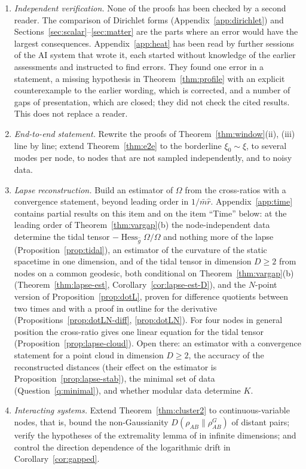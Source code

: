 \documentclass[11pt,a4paper]{article}
\theoremstyle{stmt}
\theoremstyle{defn}
\theoremstyle{rmk}
\numberwithin{equation}{section}
\begin{document}
\begin{enumerate}
\item \emph{Independent verification.} None of the proofs has been checked by a second reader. The comparison of Dirichlet forms (Appendix~\ref{app:dirichlet}) and Sections~\ref{sec:scalar}--\ref{sec:matter} are the parts where an error would have the largest consequences. Appendix~\ref{app:heat} has been read by further sessions of the AI system that wrote it, each started without knowledge of the earlier assessments and instructed to find errors. They found one error in a statement, a missing hypothesis in Theorem~\ref{thm:profile} with an explicit counterexample to the earlier wording, which is corrected, and a number of gaps of presentation, which are closed; they did not check the cited results. This does not replace a reader.
\item \emph{End-to-end statement.} Rewrite the proofs of Theorem~\ref{thm:window}(ii), (iii) line by line; extend Theorem~\ref{thm:e2e} to the borderline $\xi_0\sim\xi$, to several modes per node, to nodes that are not sampled independently, and to noisy data.
\item \emph{Lapse reconstruction.} Build an estimator of $\Omega$ from the cross-ratios with a convergence statement, beyond leading order in $1/\bar m\hat r$. Appendix~\ref{app:time} contains partial results on this item and on the item ``Time'' below: at the leading order of Theorem~\ref{thm:vargap}(b) the node-independent data determine the tidal tensor $-\operatorname{Hess}_{\hat g}\Omega/\Omega$ and nothing more of the lapse (Proposition~\ref{prop:tidal}), an estimator of the curvature of the static spacetime in one dimension, and of the tidal tensor in dimension $D\ge2$ from nodes on a common geodesic, both conditional on Theorem~\ref{thm:vargap}(b) (Theorem~\ref{thm:lapse-est}, Corollary~\ref{cor:lapse-est-D}), and the $N$-point version of Proposition~\ref{prop:dotL}, proven for difference quotients between two times and with a proof in outline for the derivative (Propositions~\ref{prop:dotLN-diff}, \ref{prop:dotLN}). For four nodes in general position the cross-ratio gives one linear equation for the tidal tensor (Proposition~\ref{prop:lapse-cloud}). Open there: an estimator with a convergence statement for a point cloud in dimension $D\ge2$, the accuracy of the reconstructed distances (their effect on the estimator is Proposition~\ref{prop:lapse-stab}), the minimal set of data (Question~\ref{q:minimal}), and whether modular data determine $K$.
\item \emph{Interacting systems.} Extend Theorem~\ref{thm:cluster2} to continuous-variable nodes, that is, bound the non-Gaussianity $D(\rho_{AB}\|\rho^G_{AB})$ of distant pairs; verify the hypotheses of the extremality lemma of \cite{WGC} in infinite dimensions; and control the direction dependence of the logarithmic drift in Corollary~\ref{cor:gapped}.

\end{enumerate}
\end{document}
